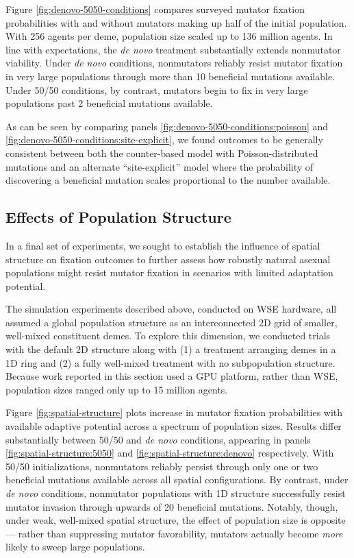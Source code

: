 Figure \ref{fig:denovo-5050-conditions} compares surveyed mutator fixation probabilities with and without mutators making up half of the initial population.
With 256 agents per deme, population size scaled up to 136 million agents.
In line with expectations, the \textit{de novo} treatment substantially extends nonmutator viability.
Under \textit{de novo} conditions, nonmutators reliably resist mutator fixation in very large populations through more than 10 beneficial mutations available.
Under 50/50 conditions, by contrast, mutators begin to fix in very large populations past 2 beneficial mutations available.

As can be seen by comparing panels \ref{fig:denovo-5050-conditions:poisson} and \ref{fig:denovo-5050-conditions:site-explicit}, we found outcomes to be generally consistent between both the counter-based model with Poisson-distributed mutations and an alternate ``site-explicit'' model where the probability of discovering a beneficial mutation scales proportional to the number available.

\subsection{Effects of Population Structure}
\label{sec:population-structure}

In a final set of experiments, we sought to establish the influence of spatial structure on fixation outcomes to further assess how robustly natural asexual populations might resist mutator fixation in scenarios with limited adaptation potential.

The simulation experiments described above, conducted on WSE hardware, all assumed a global population structure as an interconnected 2D grid of smaller, well-mixed constituent demes.
To explore this dimension, we conducted trials with the default 2D structure along with (1) a treatment arranging demes in a 1D ring and (2) a fully well-mixed treatment with no subpopulation structure.
Because work reported in this section used a GPU platform, rather than WSE, population sizes ranged only up to 15 million agents.



Figure \ref{fig:spatial-structure} plots increase in mutator fixation probabilities with available adaptive potential across a spectrum of population sizes.
Results differ substantially between 50/50 and \textit{de novo} conditions, appearing in panels \ref{fig:spatial-structure:5050} and \ref{fig:spatial-structure:denovo} respectively.
With 50/50 initializations, nonmutators reliably persist through only one or two beneficial mutations available across all spatial configurations.
By contrast, under \textit{de novo} conditions, nonmutator populations with 1D structure successfully resist mutator invasion through upwards of 20 beneficial mutations.
Notably, though, under weak, well-mixed spatial structure, the effect of population size is opposite --- rather than suppressing mutator favorability, mutators actually become \textit{more} likely to sweep large populations.

